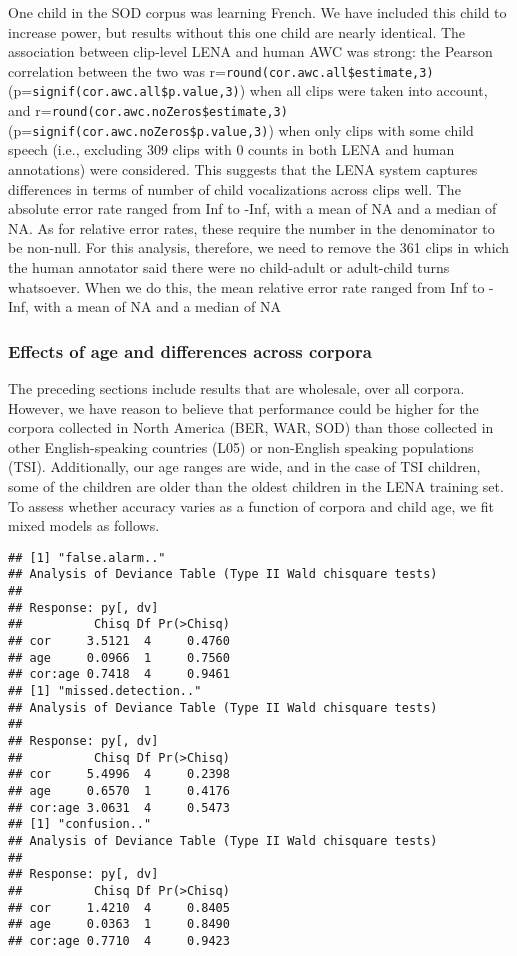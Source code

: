 \documentclass[english,floatsintext,man]{apa6}
\begin{document}
One child in the SOD corpus was learning French. We have included this
child to increase power, but results without this one child are nearly
identical. The association between clip-level LENA and human AWC was
strong: the Pearson correlation between the two was
r=\texttt{round(cor.awc.all\$estimate,3)}
(p=\texttt{signif(cor.awc.all\$p.value,3)}) when all clips were taken
into account, and r=\texttt{round(cor.awc.noZeros\$estimate,3)}
(p=\texttt{signif(cor.awc.noZeros\$p.value,3)}) when only clips with
some child speech (i.e., excluding 309 clips with 0 counts in both LENA
and human annotations) were considered. This suggests that the LENA
system captures differences in terms of number of child vocalizations
across clips well. The absolute error rate ranged from Inf to -Inf, with
a mean of NA and a median of NA. As for relative error rates, these
require the number in the denominator to be non-null. For this analysis,
therefore, we need to remove the 361 clips in which the human annotator
said there were no child-adult or adult-child turns whatsoever. When we
do this, the mean relative error rate ranged from Inf to -Inf, with a
mean of NA and a median of NA

\subsubsection{Effects of age and differences across
corpora}\label{effects-of-age-and-differences-across-corpora}

The preceding sections include results that are wholesale, over all
corpora. However, we have reason to believe that performance could be
higher for the corpora collected in North America (BER, WAR, SOD) than
those collected in other English-speaking countries (L05) or non-English
speaking populations (TSI). Additionally, our age ranges are wide, and
in the case of TSI children, some of the children are older than the
oldest children in the LENA training set. To assess whether accuracy
varies as a function of corpora and child age, we fit mixed models as
follows.

\begin{verbatim}
## [1] "false.alarm.."
## Analysis of Deviance Table (Type II Wald chisquare tests)
## 
## Response: py[, dv]
##          Chisq Df Pr(>Chisq)
## cor     3.5121  4     0.4760
## age     0.0966  1     0.7560
## cor:age 0.7418  4     0.9461
## [1] "missed.detection.."
## Analysis of Deviance Table (Type II Wald chisquare tests)
## 
## Response: py[, dv]
##          Chisq Df Pr(>Chisq)
## cor     5.4996  4     0.2398
## age     0.6570  1     0.4176
## cor:age 3.0631  4     0.5473
## [1] "confusion.."
## Analysis of Deviance Table (Type II Wald chisquare tests)
## 
## Response: py[, dv]
##          Chisq Df Pr(>Chisq)
## cor     1.4210  4     0.8405
## age     0.0363  1     0.8490
## cor:age 0.7710  4     0.9423
\end{verbatim}
\end{document}
